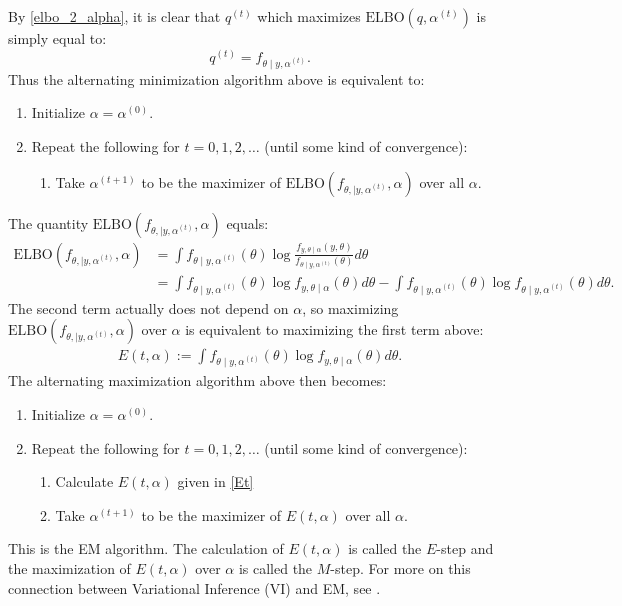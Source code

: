 \documentclass{scrartcl}
\begin{document}
By \eqref{elbo_2_alpha}, it is clear that $q^{(t)}$ which maximizes
$\text{ELBO}(q, \alpha^{(t)})$ is simply equal to:
\begin{equation*}
  q^{(t)} = f_{\theta \mid y, \alpha^{(t)}}. 
\end{equation*}
Thus the alternating minimization algorithm above is equivalent to:
\begin{enumerate}
\item Initialize $\alpha = \alpha^{(0)}$.
\item Repeat the following for $t = 0, 1, 2, \dots$ (until some  kind
  of convergence): 
  \begin{enumerate}
  \item Take $\alpha^{(t+1)}$ to be the maximizer of
    $\text{ELBO}(f_{\theta, \mid y, \alpha^{(t)}}, 
    \alpha)$ over all $\alpha$. 
  \end{enumerate}
\end{enumerate}
The quantity $\text{ELBO}(f_{\theta, \mid y, \alpha^{(t)}},
\alpha)$ equals:
\begin{align*}
  \text{ELBO}(f_{\theta, \mid y, \alpha^{(t)}},
\alpha) &= \int f_{\theta \mid y, \alpha^{(t)}}(\theta) \log
          \frac{f_{y, \theta \mid \alpha}(y, \theta)}{f_{\theta \mid
          y, \alpha^{(t)}}(\theta)} d\theta  \\
  &= \int f_{\theta \mid y, \alpha^{(t)}}(\theta) \log f_{y, \theta
    \mid \alpha}(\theta) d\theta - \int f_{\theta \mid y,
    \alpha^{(t)}}(\theta) \log f_{\theta \mid y, \alpha^{(t)}}(\theta)
    d\theta. 
\end{align*}
The second term actually does not depend on $\alpha$, so maximizing
$\text{ELBO}(f_{\theta, \mid y, \alpha^{(t)}}, \alpha)$  over $\alpha$
is equivalent to maximizing the first term above:
\begin{align}\label{Et}
  E(t, \alpha) := \int f_{\theta \mid y, \alpha^{(t)}}(\theta) \log f_{y, \theta
    \mid \alpha}(\theta) d\theta. 
\end{align}
The alternating maximization algorithm above then becomes:
\begin{enumerate}
\item Initialize $\alpha = \alpha^{(0)}$.
\item Repeat the following for $t = 0, 1, 2, \dots$ (until some  kind
  of convergence): 
  \begin{enumerate}
  \item Calculate $E(t, \alpha)$ given in \eqref{Et}
  \item Take $\alpha^{(t+1)}$ to be the maximizer of
    $E(t, \alpha)$ over all $\alpha$. 
  \end{enumerate}
\end{enumerate}
This is the EM algorithm. The calculation of $E(t, \alpha)$ is called
the $E$-step and the maximization of $E(t, \alpha)$ over $\alpha$ is
called the $M$-step. For more on this connection between Variational
Inference (VI) and EM,
see \citet{neal1998view}. 
\end{document}
